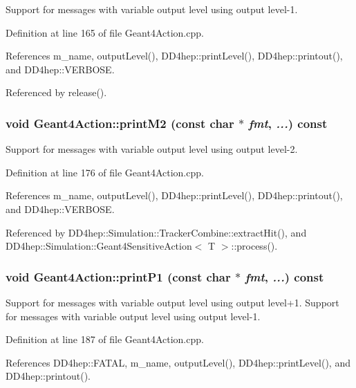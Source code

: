 Support for messages with variable output level using output level-\/1. 

Definition at line 165 of file Geant4Action.cpp.

References m\_\-name, outputLevel(), DD4hep::printLevel(), DD4hep::printout(), and DD4hep::VERBOSE.

Referenced by release().\hypertarget{class_d_d4hep_1_1_simulation_1_1_geant4_action_affc21c47844a7be6edf2824d4d042e64}{
\subsubsection[{printM2}]{\setlength{\rightskip}{0pt plus 5cm}void Geant4Action::printM2 (const char $\ast$ {\em fmt}, \/   {\em ...}) const}}
\label{class_d_d4hep_1_1_simulation_1_1_geant4_action_affc21c47844a7be6edf2824d4d042e64}


Support for messages with variable output level using output level-\/2. 

Definition at line 176 of file Geant4Action.cpp.

References m\_\-name, outputLevel(), DD4hep::printLevel(), DD4hep::printout(), and DD4hep::VERBOSE.

Referenced by DD4hep::Simulation::TrackerCombine::extractHit(), and DD4hep::Simulation::Geant4SensitiveAction$<$ T $>$::process().\hypertarget{class_d_d4hep_1_1_simulation_1_1_geant4_action_a655489f4d250231f566c6db624a70410}{
\subsubsection[{printP1}]{\setlength{\rightskip}{0pt plus 5cm}void Geant4Action::printP1 (const char $\ast$ {\em fmt}, \/   {\em ...}) const}}
\label{class_d_d4hep_1_1_simulation_1_1_geant4_action_a655489f4d250231f566c6db624a70410}


Support for messages with variable output level using output level+1. Support for messages with variable output level using output level-\/1. 

Definition at line 187 of file Geant4Action.cpp.

References DD4hep::FATAL, m\_\-name, outputLevel(), DD4hep::printLevel(), and DD4hep::printout().

